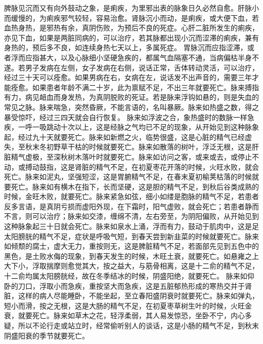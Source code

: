 \documentclass[a4paper,12pt,UTF8,twoside]{ctexbook}
\begin{document}
脾脉见沉而又有向外鼓动之象，是痢疾，为里邪出表的脉象日久必然自愈。肝脉小而缓慢的，为痢疾邪气较轻，容易治愈。肾脉沉小而动，是痢疾，或大便下血，若血热身热，是邪热有余，真阴伤败，为预后不良的死症。心肝二脏所发生的痢疾，亦见下血，如果是两脏同病的，可以治疗，若其脉都出现小沉而涩滞的痢疾，兼有身热的，预后多不良，如连续身热七天以上，多属死症。
胃脉沉而应指涩滞，或者浮而应指甚大，以及心脉细小坚硬急疾的，都属气血隔塞不通，当病偏枯半身不遂。若男子发病在左侧，女子发病在右侧，说话正常，舌体转动灵活，可以治疗，经过三十天可以痊愈。如果男病在右，女病在左，说话发不出声音的，需要三年才能痊愈。如果患者年龄不满二十岁，此为禀赋不足，不出三年就要死亡。脉来搏指有力，病见衄血而身发热，为真阴脱败的死证。若是脉来浮钩如悬的，则是失血的常见之脉。脉来喘急，突然昏厥，不能言语的，名叫暴厥。脉来如热盛之数，得之暴受惊吓，经过三四天就会自行恢复。
脉来如浮波之合，象热盛时的数脉一样急疾，一呼一吸跳动十次以上，这是经脉之气均已不足的现象，从开始见到这种脉象起，经过九十天就要死亡。脉来如新燃之火，临势很盛，这是心脏的精气已经虚失，至秋末冬初野草干枯的时候就要死亡。脉来如散落的树叶，浮泛无根，这是肝脏精气虚极，至深秋树木落叶时就要死亡。脉来如访问之客，或来或去，或停止不动，或搏动鼓指，这是肾脏的精气不足，在初夏枣花开落的时候，火旺水败，就会死亡。脉来如泥丸，坚强短涩，这是胃腑精气不足，在春末夏初榆荚枯落的时候就要死亡。脉来如有横木在指下，长而坚硬，这是胆的精气不足，到秋后谷类成熟的时候，金旺木败，就要死亡。脉来紧急如弦，细小如缕是胞脉的精气不足，若患者反多言语，是真阴亏损而虚阳外现，在下霜时，阳气虚败，就会死亡；若患者静而不言，则可以治疗；脉来如交漆，缠绵不清，左右旁至，为阴阳偏败，从开始见到这种脉象起三十日就会死亡。脉来如泉水上涌，浮而有力，鼓动于肌肉中，这是足太阳膀胱的精气不足，症状是呼吸气短，到春天尝到新韭菜的时候就要死亡。脉来如倾颓的腐士，虚大无力，重按则无，这是脾脏精气不足，若面部先见到五色中的黑色，是土败水侮的现象，到春天发生的时候，木旺土衰，就要死亡。如悬雍之上大下小，浮取揣摩则愈觉其大，按之益大，与筋骨相离，这是十二俞的精气不足，十二俞均属太阳膀胱经，故在冬季结冰的时候，阴盛阳绝，就要死亡。
脉来如仰卧的刀口，浮取小而急疾，重按坚大而急疾，这是五脏郁热形成的寒热交并于肾脏，这样的病人尽能睡卧，不能坐起，至立春阳盛阴衰时就要死亡。脉来如弹丸，短小而滑，按之无根，这是大肠的精气不足，在初夏枣草树生叶的时候，火旺金衰，就要死亡。脉来如草木之花，轻浮柔弱，其人易发惊恐，坐卧不宁，内心多疑，所以不论行走或站立时，经常偷听别人的谈话，这是小肠的精气不足，到秋末阴盛阳衰的季节就要死亡。
\end{document}
